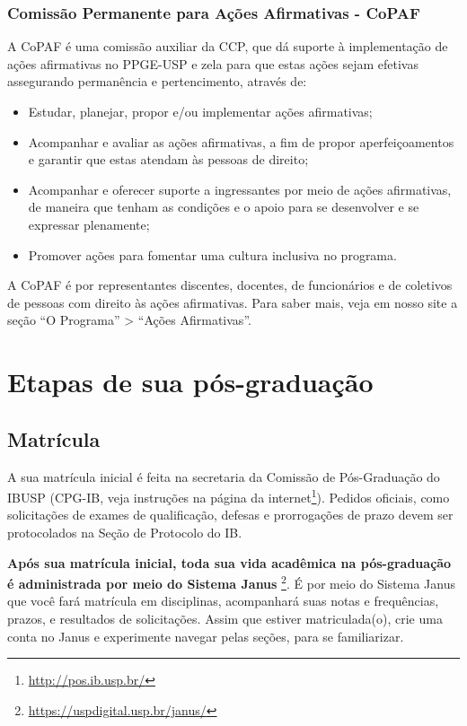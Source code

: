 \subsection{Comissão Permanente para Ações Afirmativas - CoPAF}
A CoPAF é uma comissão auxiliar da CCP, que dá suporte à implementação
de ações afirmativas no PPGE-USP e zela para que estas ações sejam
efetivas assegurando permanência e pertencimento, através de:
\begin{itemize}
\item Estudar, planejar, propor e/ou implementar ações afirmativas; 
\item Acompanhar e avaliar as ações afirmativas, a fim de propor
aperfeiçoamentos e garantir que estas atendam às pessoas de direito;
\item Acompanhar e oferecer suporte a ingressantes por meio de ações
afirmativas, de maneira que tenham as condições e o apoio para se
desenvolver e se expressar plenamente;
\item Promover ações para fomentar uma cultura inclusiva no programa.
\end{itemize}

A CoPAF é por representantes discentes, docentes, de funcionários e de
coletivos de pessoas com direito às ações afirmativas. Para saber
mais, veja em nosso site a seção ``O Programa'' > ``Ações
Afirmativas''.

\chapter{Etapas de sua pós-graduação}

\section{Matrícula}

A sua matrícula inicial é feita na secretaria da Comissão de
Pós-Graduação do IBUSP (CPG-IB, veja instruções na página da
internet\footnote{\url{http://pos.ib.usp.br/}}). Pedidos oficiais,
como solicitações de exames de qualificação, defesas e prorrogações de
prazo devem ser protocolados na Seção de Protocolo do IB.

\textbf{Após sua matrícula inicial, toda sua vida acadêmica na
  pós-graduação é administrada por meio do Sistema Janus}
\footnote{\url{https://uspdigital.usp.br/janus/}}. É por meio do Sistema
Janus que você fará matrícula em disciplinas, acompanhará suas notas e
frequências, prazos, e resultados de solicitações. Assim que estiver
matriculada(o), crie uma conta no Janus e experimente navegar pelas
seções, para se familiarizar.


